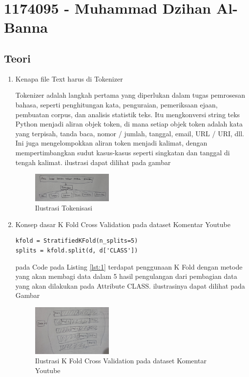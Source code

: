 \section{1174095 - Muhammad Dzihan Al-Banna}
\subsection{Teori}
\begin{enumerate}
\item Kenapa file Text harus di Tokenizer
\par Tokenizer adalah langkah pertama yang diperlukan dalam tugas pemrosesan bahasa, seperti penghitungan kata, penguraian, pemeriksaan ejaan, pembuatan corpus, dan analisis statistik teks. Itu mengkonversi string teks Python menjadi aliran objek token, di mana setiap objek token adalah kata yang terpisah, tanda baca, nomor / jumlah, tanggal, email, URL / URI, dll. Ini juga mengelompokkan aliran token menjadi kalimat, dengan mempertimbangkan sudut kasus-kasus seperti singkatan dan tanggal di tengah kalimat. ilustrasi dapat dilihat pada gambar

\begin{figure}[H]
    \includegraphics[width=4cm]{figures/1174095/chapter7/teori1.jpeg}
    \centering
      \caption{Ilustrasi Tokenisasi}
\end{figure}

\item Konsep dasar K Fold Cross Validation pada dataset Komentar Youtube

\begin{lstlisting}[caption=K Fold Cross Validation,label={lst:1}]
kfold = StratifiedKFold(n_splits=5)
splits = kfold.split(d, d['CLASS'])
\end{lstlisting}

\par pada Code pada Listing \ref{lst:1} terdapat penggunaan K Fold dengan metode yang akan membagi data dalam 5 hasil pengulangan dari pembagian data yang akan dilakukan pada Attribute CLASS. ilustrasinya dapat dilihat pada Gambar

\begin{figure}[H]
    \includegraphics[width=4cm]{figures/1174095/chapter7/teori2.jpeg}
    \centering
      \caption{Ilustrasi  K Fold Cross Validation pada dataset Komentar Youtube}
\end{figure}


\end{enumerate}
